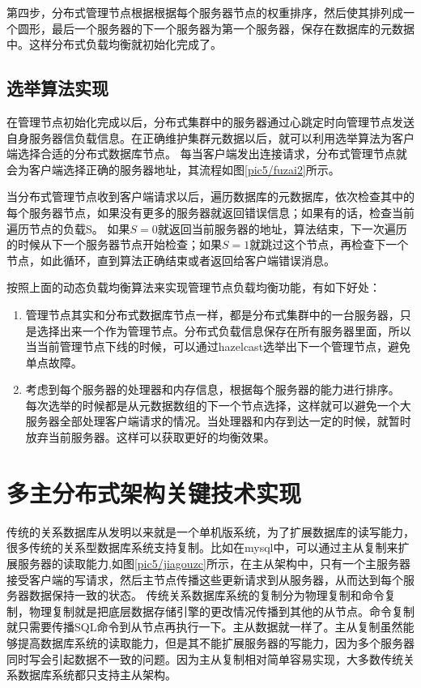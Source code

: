 第四步，分布式管理节点根据根据每个服务器节点的权重排序，然后使其排列成一个圆形，最后一个服务器的下一个服务器为第一个服务器，保存在数据库的元数据中。这样分布式负载均衡就初始化完成了。
\subsection{选举算法实现}
在管理节点初始化完成以后，分布式集群中的服务器通过心跳定时向管理节点发送自身服务器信负载信息。在正确维护集群元数据以后，就可以利用选举算法为客户端选择合适的分布式数据库节点。
每当客户端发出连接请求，分布式管理节点就会为客户端选择正确的服务器地址，其流程如图\ref{pic5/fuzai2}所示。

当分布式管理节点收到客户端请求以后，遍历数据库的元数据库，依次检查其中的每个服务器节点，如果没有更多的服务器就返回错误信息；如果有的话，检查当前遍历节点的负载S。
如果$ S=0 $就返回当前服务器的地址，算法结束，下一次遍历的时候从下一个服务器节点开始检查；如果$ S=1 $就跳过这个节点，再检查下一个节点，如此循环，直到算法正确结束或者返回给客户端错误消息。

按照上面的动态负载均衡算法来实现管理节点负载均衡功能，有如下好处：
\begin{enumerate}
	\item 管理节点其实和分布式数据库节点一样，都是分布式集群中的一台服务器，只是选择出来一个作为管理节点。分布式负载信息保存在所有服务器里面，所以当当前管理节点下线的时候，可以通过hazelcast选举出下一个管理节点，避免单点故障。
	\item 考虑到每个服务器的处理器和内存信息，根据每个服务器的能力进行排序。
	每次选举的时候都是从元数据数组的下一个节点选择，这样就可以避免一个大服务器全部处理客户端请求的情况。当处理器和内存到达一定的时候，就暂时放弃当前服务器。这样可以获取更好的均衡效果。
\end{enumerate}
\section{多主分布式架构关键技术实现}
传统的关系数据库从发明以来就是一个单机版系统，为了扩展数据库的读写能力，很多传统的关系型数据库系统支持复制。比如在mysql中，可以通过主从复制来扩展服务器的读取能力,如图\ref{pic5/jiagouzc}所示，在主从架构中，只有一个主服务器接受客户端的写请求，然后主节点传播这些更新请求到从服务器，从而达到每个服务器数据保持一致的状态。
传统关系数据库系统的复制分为物理复制和命令复制，物理复制就是把底层数据存储引擎的更改情况传播到其他的从节点。命令复制就只需要传播SQL命令到从节点再执行一下。主从数据就一样了。主从复制虽然能够提高数据库系统的读取能力，但是其不能扩展服务器的写能力，因为多个服务器同时写会引起数据不一致的问题。因为主从复制相对简单容易实现，大多数传统关系数据库系统都只支持主从架构。

